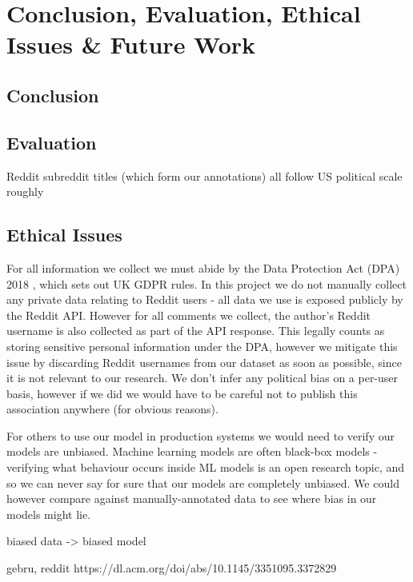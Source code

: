 \chapter{Conclusion, Evaluation, Ethical Issues \& Future Work}

\section{Conclusion}



\section{Evaluation}

Reddit subreddit titles (which form our annotations) all follow US political scale roughly

\section{Ethical Issues}


For all information we collect we must abide by the Data Protection Act (DPA) 2018 \cite{dpa}, which sets out UK GDPR rules. In this project we do not manually collect any private data relating to Reddit users - all data we use is exposed publicly by the Reddit API. However for all comments we collect, the author's Reddit username is also collected as part of the API response. This legally counts as storing sensitive personal information under the DPA, however we mitigate this issue by discarding Reddit usernames from our dataset as soon as possible, since it is not relevant to our research. We don't infer any political bias on a per-user basis, however if we did we would have to be careful not to publish this association anywhere (for obvious reasons).

For others to use our model in production systems we would need to verify our models are unbiased. Machine learning models are often black-box models - verifying what behaviour occurs inside ML models is an open research topic, and so we can never say for sure that our models are completely unbiased. We could however compare against manually-annotated data to see where bias in our models might lie.


biased data -> biased model

gebru, reddit
https://dl.acm.org/doi/abs/10.1145/3351095.3372829


